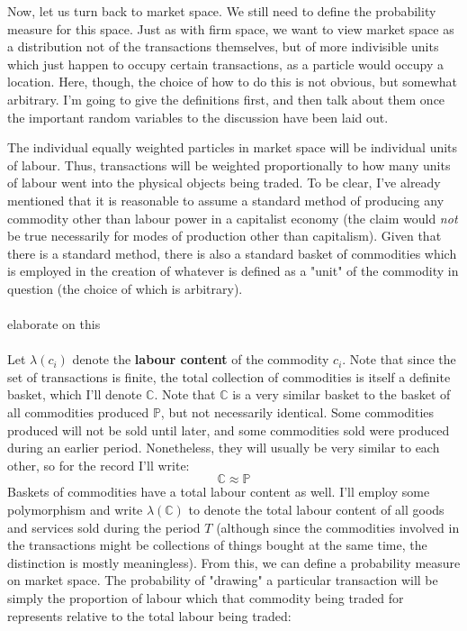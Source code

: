 \documentclass{article}
\theoremstyle{definition}
\theoremstyle{plain}
\theoremstyle{theorem}
\begin{document}
Now, let us turn back to market space. We still need to define the probability measure for this space. Just as with firm space, we want to view market space as a distribution not of the transactions themselves, but of more indivisible units which just happen to occupy certain transactions, as a particle would occupy a location. Here, though, the choice of how to do this is not obvious, but somewhat arbitrary. I'm going to give the definitions first, and then talk about them once the important random variables to the discussion have been laid out. \par 
The individual equally weighted particles in market space will be individual units of labour. Thus, transactions will be weighted proportionally to how many units of labour went into the physical objects being traded. To be clear, I've already mentioned that it is reasonable to assume a standard method of producing any commodity other than labour power in a capitalist economy (the claim would \textit{not} be true necessarily for modes of production other than capitalism). Given that there is a standard method, there is also a standard basket of commodities which is employed in the creation of whatever is defined as a "unit" of the commodity in question (the choice of which is arbitrary). 
\\
\\
elaborate on this
\\
\\
Let $\lambda(c_i)$ denote the \textbf{labour content} of the commodity $c_i$. Note that since the set of transactions is finite, the total collection of commodities is itself a definite basket, which I'll denote $\mathbb{C}$. Note that $\mathbb{C}$ is a very similar basket to the basket of all commodities produced $\mathbb{P}$, but not necessarily identical. Some commodities produced will not be sold until later, and some commodities sold were produced during an earlier period. Nonetheless, they will usually be very similar to each other, so for the record I'll write:
\[ \mathbb{C} \approx \mathbb{P} \]
Baskets of commodities have a total labour content as well. I'll employ some polymorphism and write $\lambda(\mathbb{C})$ to denote the total labour content of all goods and services sold during the period $T$ (although since the commodities involved in the transactions might be collections of things bought at the same time, the distinction is mostly meaningless). From this, we can define a probability measure on market space. The probability of "drawing" a particular transaction will be simply the proportion of labour which that commodity being traded for represents relative to the total labour being traded:
\end{document}
